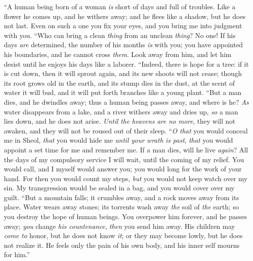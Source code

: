 \begin{biblechapter} %
 “A human being born of a woman 
\textit{is} short of days and full of troubles.
\verse Like a flower he comes up, and he withers away; 
and he flees like a shadow, but he does not last.
\verse Even on such a one you fix your eyes, 
and you bring me into judgment with you.
\verse “Who can bring a clean \textit{thing} from an unclean \textit{thing}? 
No one!
\verse If his days \textit{are} determined, the number of his months \textit{is} with you; 
you have appointed his boundaries, and he cannot cross \textit{them}.
\verse Look away from him, and let him desist 
until he enjoys his days like a laborer.
\verse “Indeed, there is hope for a tree: 
if it is cut down, then it will sprout again, 
and its new shoots will not cease;
\verse though its root grows old in the earth, 
and its stump dies in the dust,
\verse at the scent of water it will bud, 
and it will put forth branches like a young plant.
\verse “But a man dies, and he dwindles away; 
thus a human being passes away, and where is he?
\verse \textit{As} water disappears from a lake, 
and a river withers away and dries up,
\verse \textit{so} a man lies down, and he does not arise. 
\textit{Until the heavens are no more}, they will not awaken, 
and they will not be roused out of their sleep.
\verse “\textit{O that} you would conceal me in Sheol, 
\textit{that} you would hide me \textit{until your wrath is past}, 
\textit{that} you would appoint a set time for me and remember me.
\verse If a man dies, will he live \textit{again}? 
All the days of my compulsory service I will wait, 
until the coming of my relief.
\verse You would call, and I myself would answer you; 
you would long for the work of your hand.
\verse For then you would count my steps, 
\textit{but} you would not keep watch over my sin.
\verse My transgression would be sealed in a bag, 
and you would cover over my guilt.
\verse “But a mountain falls; it crumbles away, 
and a rock moves away from its place.
\verse Water wears away stones; 
its torrents wash away \textit{the} soil of \textit{the} earth; 
so you destroy the hope of human beings.
\verse You overpower him forever, and he passes away; 
\textit{you} change \textit{his countenance}, \textit{then} you send him away.
\verse His children may \textit{come to} honor, but he does not know \textit{it}; 
or they may become lowly, but he does not realize it.
\verse He feels only the pain of his own body, 
and his inner self mourns for him.”
\end{biblechapter}

